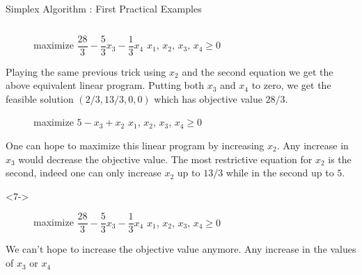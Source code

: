 \documentclass[aspectratio = 169]{beamer}
\begin{document}
\begin{frame}{Simplex Algorithm : First Practical Examples}
\begin{columns}
\begin{column}{.5\textwidth}
\begin{onlyenv}
{{\begin{figure}
{\begin{linearProg}{
                        maximize
                      }{
                        $\dfrac{28}{3} - \dfrac{5}{3}x_3 - \dfrac{1}{3}x_4$
                      }{
                      }{
                        $x_1$, $x_2$, $x_3$, $x_4 \geq 0$
                      }
                    \end{linearProg}
                  }
                \end{figure}
              }
              \vspace{-1em}              
              Playing the same previous trick using $x_2$ and the
              second equation we get the above equivalent linear
              program. Putting both $x_3$ and $x_4$ to zero, we get
              the feasible solution $(2/3, 13/3, 0, 0)$ which has
              objective value $28/3$.  }{
                \begin{figure}
                  \small{
                    \begin{linearProg}{
                        maximize
                      }{
                        $5 - x_3 + x_2$
                      }{
                      }{
                        $x_1$, $x_2$, $x_3$, $x_4 \geq 0$
                      }
                    \end{linearProg}
                  }
                \end{figure}                
                One can hope to maximize this linear program by
                increasing $x_2$. Any increase in $x_3$ would decrease
                the objective value. The most restrictive equation for
                $x_2$ is the second, indeed one can only increase
                $x_2$ up to $13/3$ while in the second up to $5$.  }
            \end{onlyenv}
            \begin{onlyenv}<7->
                \begin{figure}
                  \small{
                    \begin{linearProg}{
                        maximize
                      }{
                        $\dfrac{28}{3} - \dfrac{5}{3}x_3 - \dfrac{1}{3}x_4$
                      }{
                      }{
                        $x_1$, $x_2$, $x_3$, $x_4 \geq 0$
                      }
                    \end{linearProg}
                  }
                \end{figure}
                \vspace{-1em}
                We can't hope to increase the objective value
                anymore. Any increase in the values of $x_3$ or $x_4$

\end{onlyenv}
\end{column}
\end{columns}
\end{frame}
\end{document}
